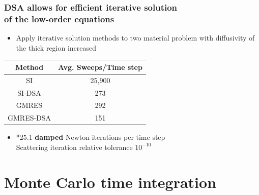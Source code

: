 \documentclass[xcolor=dvipsnames,hyperref={pdfpagelabels=false},unknownkeysallowed]{beamer}
\newcommand{\colb}[1]{{\color{blue} #1}}
\newcommand{\colG}[1]{{\color{Gray!110} #1}}
\newlength{\wideitemsep}
\let\olditem\item
\renewcommand{\item}{\setlength{\itemsep}{\wideitemsep}\olditem}
\begin{document}
\begin{frame}
\end{frame}




\begin{frame}
    \frametitle{DSA allows for efficient iterative solution \\  of the low-order equations}
    \begin{itemize}
        \item[] Apply iterative solution methods to two material problem
            with diffusivity of the thick region increased
    \end{itemize}
\begin{table}[p]
    \centering
    \begin{tabular}{c|c} \hline
        Method & Avg. Sweeps/Time step \\ \hline
        SI        & 25,900      \\
        SI-DSA    & \colb{273}        \\
        GMRES     & 292         \\
        GMRES-DSA & \colb{151}      \\ \hline
    \end{tabular}
\end{table}
\begin{itemize}
    \item[]\colG{*25.1 \textbf{damped} Newton iterations per time step \\ Scattering iteration relative tolerance $10^{-10}$}
    \end{itemize}
\end{frame}

\section{Monte Carlo time integration}
\end{document}
